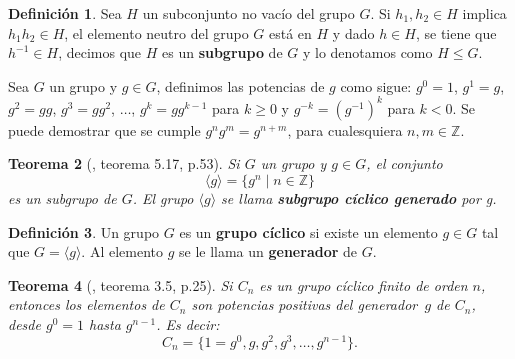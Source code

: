 \documentclass[12pt]{book}
\newtheorem{theorem}{Teorema}[section]
\theoremstyle{definition}
\newtheorem{definition}[theorem]{Definición}
\newcounter{in}
\newcounter{ini}
\begin{document}
\begin{definition}
  Sea $H$ un subconjunto no vacío del grupo $G$. Si 
  $h_{1},h_{2}\in H$ implica $h_{1}h_{2}\in H$, el
  elemento neutro del grupo $G$ está en $H$ y dado $h\in H$, se tiene que
  $h^{-1}\in H$, decimos que $H$ es un \textbf{subgrupo} de $G$ y
  lo denotamos como $H\leq G$.
\end{definition}

Sea $G$ un grupo y $g\in G$, definimos las potencias de $g$ como
sigue: $g^{0}=1$, $g^{1}=g$, $g^{2}=gg$, $g^{3}=gg^{2}$, $\dots$,
$g^{k}=gg^{k-1}$ para $k\geq0$ y $g^{-k}=(g^{-1})^{k}$ para $k<0$. Se
puede demostrar que se cumple $g^{n}g^{m}=g^{n+m}$, para cualesquiera
$n,m\in\mathbb{Z}$.

\begin{theorem}[\cite{fraleigh}, teorema 5.17, p.53]
  Si $G$ un grupo y $g\in G$, el conjunto
  \begin{equation*}
    \langle g\rangle=\{g^{n}\mid n\in\mathbb{Z}\}
  \end{equation*}
  es un subgrupo de $G$. El grupo $\langle g\rangle$ se llama \textbf{subgrupo
  cíclico generado} por g.
\end{theorem}

\begin{definition}
  \label{grupo-ciclico}
  Un grupo $G$ es un \textbf{grupo cíclico} si existe un
   elemento $g\in G$ tal que $G=\langle g\rangle$.
   Al elemento $g$ se le llama un \textbf{generador} de $G$.
\end{definition}

\begin{theorem}[\cite{zaldivar}, teorema 3.5, p.25]
  Si $C_{n}$ es un grupo cíclico finito de orden $n$, entonces los elementos de $C_{n}$ son
  potencias positivas del generador~$g$ de $C_{n}$, desde $g^{0}=1$
  hasta $g^{n-1}$. Es decir:
  \begin{equation*}
    C_{n}=\{1=g^{0},g,g^{2},g^{3},\dots,g^{n-1}\}.
  \end{equation*}
\end{theorem}

\end{document}
